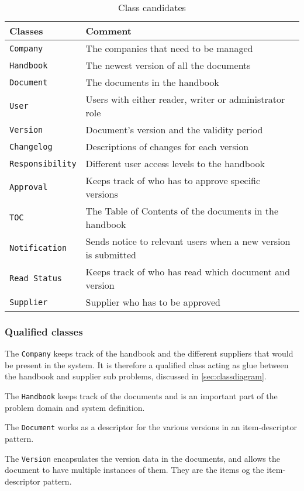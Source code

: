 \begin{table} [H]
	\centering
\begin{tabular}{l l}
	\hline
	Classes & Comment\\
	\hline
	\texttt{Company} & The companies that need to be managed \\
	\texttt{Handbook} & The newest version of all the documents\\
	\texttt{Document} & The documents in the handbook\\
	\texttt{User}& Users with either reader, writer or administrator role\\
	\texttt{Version} & Document’s version and the validity period\\
	\texttt{Changelog} & Descriptions of changes for each version\\
	\texttt{Responsibility} & Different user access levels to the handbook\\
	\texttt{Approval} & Keeps track of who has to approve specific
	versions\\
	\texttt{TOC} & The Table of Contents of the documents in the handbook\\
	\texttt{Notification} & Sends notice to relevant users when a new version is submitted\\
	\texttt{Read Status} & Keeps track of who has read which document and version\\
	\texttt{Supplier} & Supplier who has to be approved \\
	\hline
\end{tabular}
\caption{Class candidates}\label{tab:ClassCandidates}
\end{table}

\subsubsection{Qualified classes}

The \texttt{Company} keeps track of the handbook and the different suppliers that would be present in the system.
It is therefore a qualified class acting as glue between the handbook and supplier sub problems, discussed in \cref{sec:classdiagram}.

The \texttt{Handbook} keeps track of the documents and is an important part of the problem domain and system definition.

The \texttt{Document} works as a descriptor for the various versions in an item-descriptor pattern.

The \texttt{Version} encapsulates the version data in the documents, and allows the document to have multiple instances of them.
They are the items og the item-descriptor pattern.

